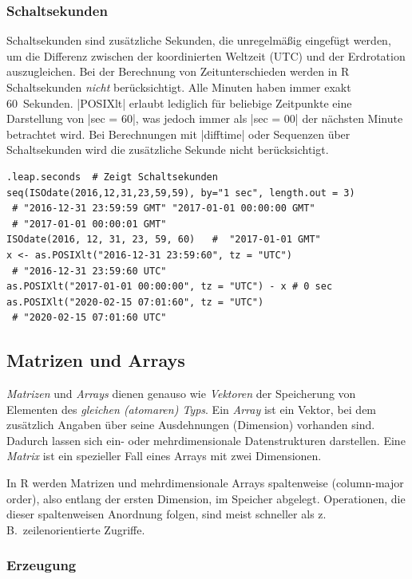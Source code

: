 \documentclass[10pt,twocolumn]{scrartcl}
\renewcommand{\lstinline}{\mycoloredinline}
\begin{document}
\subsubsection{Schaltsekunden}

Schaltsekunden sind zusätzliche Sekunden, die unregelmäßig eingefügt werden, um die Differenz zwischen der koordinierten Weltzeit (UTC) und der Erdrotation auszugleichen.
Bei der Berechnung von Zeitunterschieden werden in R Schaltsekunden \emph{nicht} berücksichtigt. Alle Minuten haben immer exakt 60~Sekunden.
\lstinline|POSIXlt| erlaubt lediglich für beliebige Zeitpunkte eine Darstellung von \lstinline|sec = 60|, was jedoch immer als \lstinline|sec = 00| der nächsten Minute betrachtet wird.
Bei Berechnungen mit \lstinline|difftime| oder Sequenzen über Schaltsekunden wird die zusätzliche Sekunde nicht berücksichtigt.

\begin{lstlisting}
.leap.seconds  # Zeigt Schaltsekunden
seq(ISOdate(2016,12,31,23,59,59), by="1 sec", length.out = 3)
 # "2016-12-31 23:59:59 GMT" "2017-01-01 00:00:00 GMT"
 # "2017-01-01 00:00:01 GMT"
ISOdate(2016, 12, 31, 23, 59, 60)   #  "2017-01-01 GMT"
x <- as.POSIXlt("2016-12-31 23:59:60", tz = "UTC")
 # "2016-12-31 23:59:60 UTC"
as.POSIXlt("2017-01-01 00:00:00", tz = "UTC") - x # 0 sec
as.POSIXlt("2020-02-15 07:01:60", tz = "UTC")
 # "2020-02-15 07:01:60 UTC"
\end{lstlisting}


\subsection{Matrizen und Arrays}

\emph{Matrizen} und \emph{Arrays} dienen genauso wie \emph{Vektoren} der Speicherung von Elementen des \emph{gleichen (atomaren) Typs}. Ein \emph{Array} ist ein Vektor, bei dem zusätzlich Angaben über seine Ausdehnungen (Dimension) vorhanden sind. Dadurch lassen sich ein- oder mehrdimensionale Datenstrukturen darstellen. Eine \emph{Matrix} ist ein spezieller Fall eines Arrays mit zwei Dimensionen.

In R werden Matrizen und mehrdimensionale Arrays spaltenweise (column-major order), also entlang der ersten Dimension, im Speicher abgelegt. Operationen, die dieser spaltenweisen Anordnung folgen, sind meist schneller als z.\,B.\ zeilenorientierte Zugriffe.


\subsubsection{Erzeugung}
\end{document}
